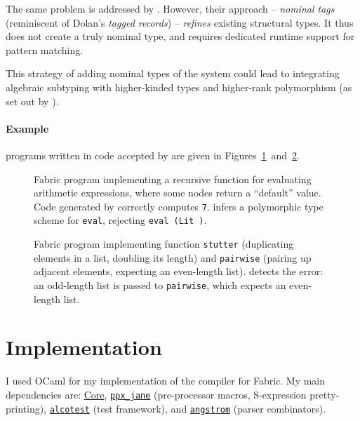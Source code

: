 The same problem is addressed by \textcite{mlstruct}. However, their approach -- \emph{nominal tags} (reminiscent of Dolan's \emph{tagged records}) -- \emph{refines} existing structural types. It thus does not create a truly nominal type, and requires dedicated runtime support for pattern matching.

This strategy of adding nominal types of the system could lead to integrating algebraic subtyping with higher-kinded types and higher-rank polymorphism (as set out by \textcite[Section~11.1]{dolan-thesis}). 

\paragraph{Example} \fabric{} programs written in code accepted by \compiler{} are given in Figures~\ref{fig:fabric-example-eval}~and~\ref{fig:fabric-example-pairwise}.

\begin{figure}[p]
    \centering
    
    \caption{Fabric program implementing a recursive function for evaluating arithmetic expressions, where some nodes return a \enquote{default} value. Code generated by \compiler{} correctly computes \texttt{7}. \inference{} infers a polymorphic type scheme for \texttt{eval}, \eg{} rejecting \texttt{eval (Lit {})}.}
    \label{fig:fabric-example-eval}
\end{figure}

\begin{figure}[p]
    \centering
    
    \caption{Fabric program implementing function \texttt{stutter} (duplicating elements in a list, doubling its length) and \texttt{pairwise} (pairing up adjacent elements, expecting an even-length list). \inference{} detects the error: an odd-length list is passed to \texttt{pairwise}, which expects an even-length list.}
    \label{fig:fabric-example-pairwise}
\end{figure}

\section{Implementation}
\label{sec:fabric-impl}

I used OCaml for my implementation of the \compiler{} compiler for Fabric. My main dependencies are: \href{https://opensource.janestreet.com/core/}{Core}, \href{https://github.com/janestreet/ppx_jane}{\texttt{ppx\_jane}} (pre-processor macros, \eg{} S-expression pretty-printing), \href{https://github.com/mirage/alcotest}{\texttt{alcotest}} (test framework), and \href{https://github.com/inhabitedtype/angstrom}{\texttt{angstrom}} (parser combinators).

